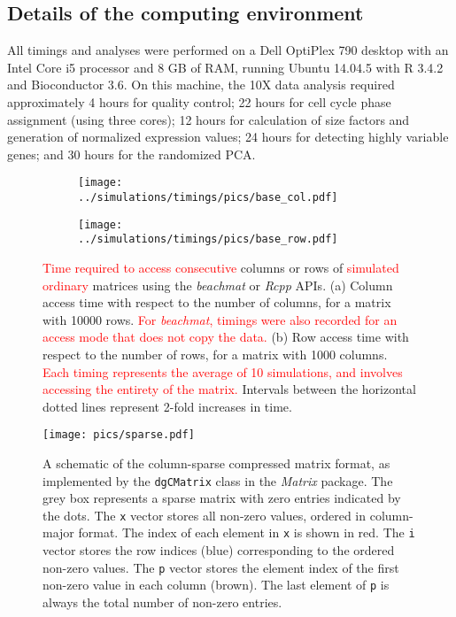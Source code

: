\documentclass{article}
\newcommand{\beachmat}{\textit{beachmat}}
\newcommand{\revised}[1]{\textcolor{red}{#1}}
\begin{document}
\subsection{Details of the computing environment}
\label{sec:systemdetails}
All timings and analyses were performed on a Dell OptiPlex 790 desktop with an Intel Core i5 processor and 8 GB of RAM, running Ubuntu 14.04.5 with R 3.4.2 and Bioconductor 3.6.
On this machine, the 10X data analysis required approximately 4 hours for quality control;
22 hours for cell cycle phase assignment (using three cores);
12 hours for calculation of size factors and generation of normalized expression values;
24 hours for detecting highly variable genes;
and 30 hours for the randomized PCA.




\newpage

\begin{figure}[bt]
    \centering
    \begin{subfigure}[b]{0.49\textwidth}
        \texttt{[image: ../simulations/timings/pics/base\_col.pdf]}
        \caption{}
    \end{subfigure}
    \begin{subfigure}[b]{0.49\textwidth}
        \texttt{[image: ../simulations/timings/pics/base\_row.pdf]}
        \caption{}
    \end{subfigure}
    \caption{\revised{Time required to access consecutive} columns or rows of \revised{simulated ordinary} matrices using the \beachmat{} or \textit{Rcpp} APIs.
        (a) Column access time with respect to the number of columns, for a matrix with 10000 rows.
        \revised{For \beachmat{}, timings were also recorded for an access mode that does not copy the data.}
        (b) Row access time with respect to the number of rows, for a matrix with 1000 columns.
        \revised{Each timing represents the average of 10 simulations, and involves accessing the entirety of the matrix.}
        Intervals between the horizontal dotted lines represent 2-fold increases in time.
    }
    \label{fig:basetime}
\end{figure}

\begin{figure}[bt]
    \centering
    \texttt{[image: pics/sparse.pdf]}
    \caption{A schematic of the column-sparse compressed matrix format, as implemented by the \texttt{dgCMatrix} class in the \textit{Matrix} package.
        The grey box represents a sparse matrix with zero entries indicated by the dots.
        The \texttt{x} vector stores all non-zero values, ordered in column-major format.
        The index of each element in \texttt{x} is shown in red.
        The \texttt{i} vector stores the row indices (blue) corresponding to the ordered non-zero values.
        The \texttt{p} vector stores the element index of the first non-zero value in each column (brown).
        The last element of \texttt{p} is always the total number of non-zero entries.
    }
    \label{fig:sparsefig}
\end{figure}
\end{document}
